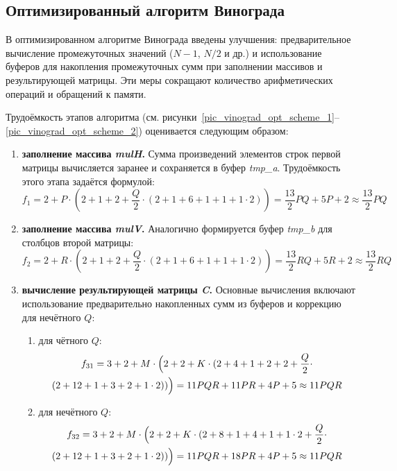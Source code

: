 \subsection{Оптимизированный алгоритм Винограда}

В оптимизированном алгоритме Винограда введены улучшения: предварительное вычисление промежуточных значений ($N-1$, $N/2$ и др.) и использование буферов для накопления промежуточных сумм при заполнении массивов и результирующей матрицы. Эти меры сокращают количество арифметических операций и обращений к памяти.

Трудоёмкость этапов алгоритма (см. рисунки~\ref{pic_vinograd_opt_scheme_1}--\ref{pic_vinograd_opt_scheme_2}) оценивается следующим образом:

\begin{enumerate}
	\item \textbf{заполнение массива \textit{mulH}.}  
	Сумма произведений элементов строк первой матрицы вычисляется заранее и сохраняется в буфер \textit{tmp\_a}. Трудоёмкость этого этапа задаётся формулой:
	\begin{equation}
		f_1 = 2 + P \cdot \left(2 + 1 + 2 + \frac{Q}{2} \cdot (2 + 1 + 6 + 1 + 1 + 1 \cdot 2) \right) 
		= \frac{13}{2} P Q + 5 P + 2 \approx \frac{13}{2} P Q
	\end{equation}
	
	\item \textbf{заполнение массива \textit{mulV}.}  
	Аналогично формируется буфер \textit{tmp\_b} для столбцов второй матрицы:
	\begin{equation}
		f_2 = 2 + R \cdot \left(2 + 1 + 2 + \frac{Q}{2} \cdot (2 + 1 + 6 + 1 + 1 + 1 \cdot 2) \right)
		= \frac{13}{2} R Q + 5 R + 2 \approx \frac{13}{2} R Q
	\end{equation}
	
	\item \textbf{вычисление результирующей матрицы \textit{C}.}  
	Основные вычисления включают использование предварительно накопленных сумм из буферов и коррекцию для нечётного $Q$:
	
	\begin{enumerate}
		\item для чётного $Q$:
		\begin{multline}
			f_{31} = 3 + 2 + M \cdot \Bigl(2 + 2 + K \cdot (2 + 4 + 1 + 2 + 2 + \frac{Q}{2} \cdot \\
			(2 + 12 + 1 + 3 + 2 + 1 \cdot 2)) \Bigr) 
			= 11 P Q R + 11 P R + 4 P + 5 \approx 11 P Q R
		\end{multline}
		
		\item для нечётного $Q$:
		\begin{multline}
			f_{32} = 3 + 2 + M \cdot \Bigl(2 + 2 + K \cdot (2 + 8 + 1 + 4 + 1 + 1 \cdot 2 + \frac{Q}{2} \cdot \\
			(2 + 12 + 1 + 3 + 2 + 1 \cdot 2)) \Bigr) 
			= 11 P Q R + 18 P R + 4 P + 5 \approx 11 P Q R
		\end{multline}
	\end{enumerate}
\end{enumerate}

